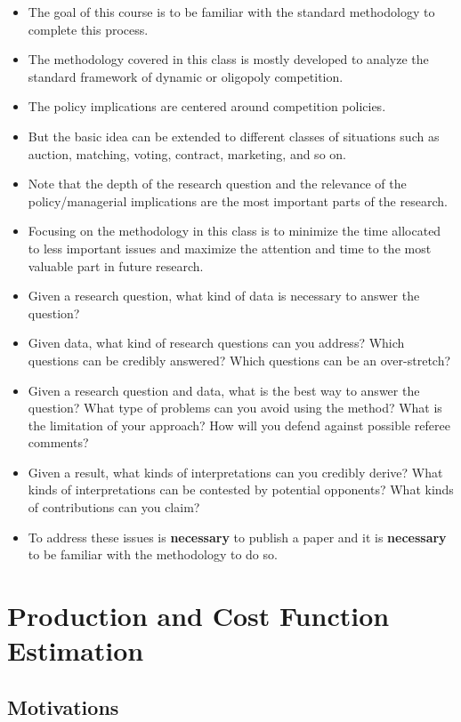 \documentclass[
]{book}
\providecommand{\tightlist}{%
  \setlength{\itemsep}{0pt}\setlength{\parskip}{0pt}}
\begin{document}
\begin{itemize}
\tightlist
\item
  The goal of this course is to be familiar with the standard methodology to complete this process.
\item
  The methodology covered in this class is mostly developed to analyze the standard framework of dynamic or oligopoly competition.
\item
  The policy implications are centered around competition policies.
\item
  But the basic idea can be extended to different classes of situations such as auction, matching, voting, contract, marketing, and so on.
\item
  Note that the depth of the research question and the relevance of the policy/managerial implications are the most important parts of the research.
\item
  Focusing on the methodology in this class is to minimize the time allocated to less important issues and maximize the attention and time to the most valuable part in future research.
\item
  Given a research question, what kind of data is necessary to answer the question?
\item
  Given data, what kind of research questions can you address? Which questions can be credibly answered? Which questions can be an over-stretch?
\item
  Given a research question and data, what is the best way to answer the question? What type of problems can you avoid using the method? What is the limitation of your approach? How will you defend against possible referee comments?
\item
  Given a result, what kinds of interpretations can you credibly derive? What kinds of interpretations can be contested by potential opponents? What kinds of contributions can you claim?
\item
  To address these issues is \textbf{necessary} to publish a paper and it is \textbf{necessary} to be familiar with the methodology to do so.
\end{itemize}

\hypertarget{production}{%
\chapter{Production and Cost Function Estimation}\label{production}}

\hypertarget{motivations}{%
\section{Motivations}\label{motivations}}
\end{document}
